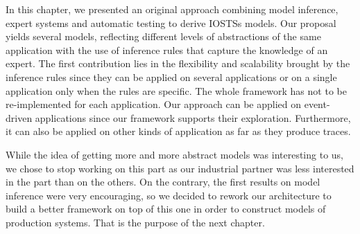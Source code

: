 In this chapter, we presented an original approach combining
model inference, expert systems and automatic testing to derive
IOSTSs models. Our proposal yields several models, reflecting
different levels of abstractions of the same application with the
use of inference rules that capture the knowledge of an expert.
The first contribution lies in the flexibility and scalability
brought by the inference rules since they can be applied on
several applications or on a single application only when the
rules are specific. The whole framework has not to be
re-implemented for each application. Our approach can be applied
on event-driven applications since our framework supports their
exploration. Furthermore, it can also be applied on other kinds
of application as far as they produce traces.

While the idea of getting more and more abstract models was
interesting to us, we chose to stop working on this part as our
industrial partner was less interested in the part than on the
others. On the contrary, the first results on model inference
were very encouraging, so we decided to rework our architecture
to build a better framework on top of this one in order to
construct models of production systems. That is the purpose of
the next chapter.
